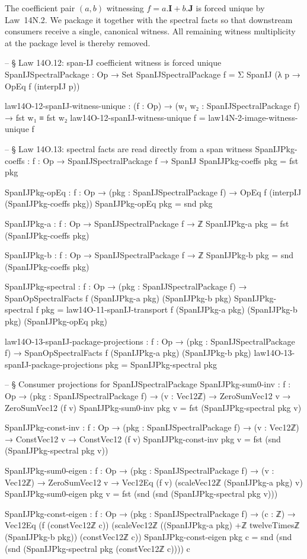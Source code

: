 \documentclass[11pt,a4paper]{book}
\def\cdot{.}%
\begin{document}
The coefficient pair $(a,b)$ witnessing $f = a\!\cdot\!\mathbf{I}+b\!\cdot\!\mathbf{J}$
is forced unique by Law~14N.2.
We package it together with the spectral facts so that
downstream consumers receive a single, canonical witness.  All
remaining witness multiplicity at the package level is thereby removed.

\begin{code}
-- § Law 14O.12: span-IJ coefficient witness is forced unique
SpanIJSpectralPackage : Op → Set
SpanIJSpectralPackage f = Σ SpanIJ (λ p → OpEq f (interpIJ p))

law14O-12-spanIJ-witness-unique : (f : Op) → (w₁ w₂ : SpanIJSpectralPackage f) → fst w₁ ≡ fst w₂
law14O-12-spanIJ-witness-unique f = law14N-2-image-witness-unique f

-- § Law 14O.13: spectral facts are read directly from a span witness
SpanIJPkg-coeffs : {f : Op} → SpanIJSpectralPackage f → SpanIJ
SpanIJPkg-coeffs pkg = fst pkg

SpanIJPkg-opEq : {f : Op} → (pkg : SpanIJSpectralPackage f) → OpEq f (interpIJ (SpanIJPkg-coeffs pkg))
SpanIJPkg-opEq pkg = snd pkg

SpanIJPkg-a : {f : Op} → SpanIJSpectralPackage f → ℤ
SpanIJPkg-a pkg = fst (SpanIJPkg-coeffs pkg)

SpanIJPkg-b : {f : Op} → SpanIJSpectralPackage f → ℤ
SpanIJPkg-b pkg = snd (SpanIJPkg-coeffs pkg)

SpanIJPkg-spectral : {f : Op} → (pkg : SpanIJSpectralPackage f) → SpanOpSpectralFacts f (SpanIJPkg-a pkg) (SpanIJPkg-b pkg)
SpanIJPkg-spectral {f} pkg =
  law14O-11-spanIJ-transport f (SpanIJPkg-a pkg) (SpanIJPkg-b pkg) (SpanIJPkg-opEq pkg)

law14O-13-spanIJ-package-projections : {f : Op} → (pkg : SpanIJSpectralPackage f) → SpanOpSpectralFacts f (SpanIJPkg-a pkg) (SpanIJPkg-b pkg)
law14O-13-spanIJ-package-projections pkg = SpanIJPkg-spectral pkg

-- § Consumer projections for SpanIJSpectralPackage
SpanIJPkg-sum0-inv : {f : Op} → (pkg : SpanIJSpectralPackage f) → (v : Vec12ℤ) → ZeroSumVec12 v → ZeroSumVec12 (f v)
SpanIJPkg-sum0-inv pkg v = fst (SpanIJPkg-spectral pkg v)

SpanIJPkg-const-inv : {f : Op} → (pkg : SpanIJSpectralPackage f) → (v : Vec12ℤ) → ConstVec12 v → ConstVec12 (f v)
SpanIJPkg-const-inv pkg v = fst (snd (SpanIJPkg-spectral pkg v))

SpanIJPkg-sum0-eigen : {f : Op} → (pkg : SpanIJSpectralPackage f) → (v : Vec12ℤ) → ZeroSumVec12 v → Vec12Eq (f v) (scaleVec12ℤ (SpanIJPkg-a pkg) v)
SpanIJPkg-sum0-eigen pkg v = fst (snd (snd (SpanIJPkg-spectral pkg v)))

SpanIJPkg-const-eigen : {f : Op} → (pkg : SpanIJSpectralPackage f) → (c : ℤ) →
  Vec12Eq (f (constVec12ℤ c))
         (scaleVec12ℤ ((SpanIJPkg-a pkg) +ℤ twelveTimesℤ (SpanIJPkg-b pkg)) (constVec12ℤ c))
SpanIJPkg-const-eigen pkg c = snd (snd (snd (SpanIJPkg-spectral pkg (constVec12ℤ c)))) c
\end{code}
\end{document}
